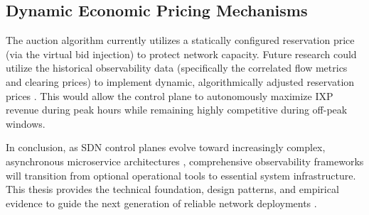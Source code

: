 \begin{conclusion}
\subsection{Dynamic Economic Pricing Mechanisms}
The auction algorithm currently utilizes a statically configured reservation price (via the virtual bid injection) to protect network capacity. Future research could utilize the historical observability data (specifically the correlated flow metrics and clearing prices) to implement dynamic, algorithmically adjusted reservation prices \cite{paulDistributedConsensusNetworkAgreement2016}. This would allow the control plane to autonomously maximize IXP revenue during peak hours while remaining highly competitive during off-peak windows.

\vspace{1em}
In conclusion, as SDN control planes evolve toward increasingly complex, asynchronous microservice architectures \cite{otelDocumentation2024}, comprehensive observability frameworks will transition from optional operational tools to essential system infrastructure. This thesis provides the technical foundation, design patterns, and empirical evidence to guide the next generation of reliable network deployments \cite{majorsObservabilityEngineering2022, thompsonDesigningObservableDistributedSystems2022}.

\end{conclusion}